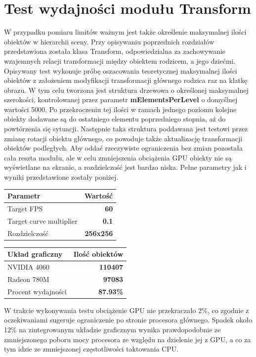 \section{Test wydajności modułu Transform}
W przypadku pomiaru limitów ważnym jest także określenie maksymalnej ilości obiektów w hierarchii sceny. Przy opisywaniu poprzednich rozdziałów przedstawiona została klasa Transform, odpowiedzialna za zachowywanie wzajemnych relacji transformacji między obiektem rodzicem, a jego dziećmi. Opisywany test wykonuje próbę oszacowania teoretycznej maksymalnej ilości obiektów z założeniem modyfikacji transformacji głównego rodzica raz na klatkę obrazu. W tym celu tworzona jest struktura drzewowa o określonej maksymalnej szerokości, kontrolowanej przez parametr \textbf{mElementsPerLevel} o domyślnej wartości 5000. Po przekroczeniu tej ilości w ramach jednego poziomu kolejne obiekty dodawane są do ostatniego elementu poprzedniego stopnia, aż do powtórzenia się sytuacji. Następnie taka struktura poddawana jest testowi przez zmianę rotacji obiektu głównego, co powoduje także aktualizację transformacji obiektów podległych. Aby oddać rzeczywiste ograniczenia bez zmian pozostała cała reszta modułu, ale w celu zmniejszenia obciążenia GPU obiekty nie są wyświetlane na ekranie, a rozdzielczość jest bardzo niska. Pełne parametry jak i wyniki przedstawione zostały poniżej.


\begin{center}
	\begin{tabular}{ |l r|}
		\hline
		\textbf{Parametr} & \textbf{Wartość} \\
		\hline
		Target FPS & \textbf{60} \\
		Target curve multiplier & \textbf{0.1} \\
		Rozdzielczość & \textbf{256x256} \\
		\hline
	\end{tabular}
	\quad
	\begin{tabular}{ |l r|}
		\hline
		\textbf{Układ graficzny} & \textbf{Ilość obiektów} \\
		\hline
		NVIDIA 4060 & \textbf{110407} \\
		Radeon 780M & \textbf{97083} \\
		\hline
		Procent wydajności & \textbf{87.93\%} \\
		\hline
	\end{tabular}
\end{center}


W trakcie wykonywania testu obciążenie GPU nie przekraczało 2\%, co zgodnie z oczekiwaniami sugeruje ograniczenie po stronie procesora głównego. Spadek około 12\% na zintegrowanym układzie graficznym wynika prawdopodobnie ze zmniejszonego poboru mocy procesora ze względu na dzielenie jej z GPU, a co za tym idzie ze zmniejszonej częstotliwości taktowania CPU.

